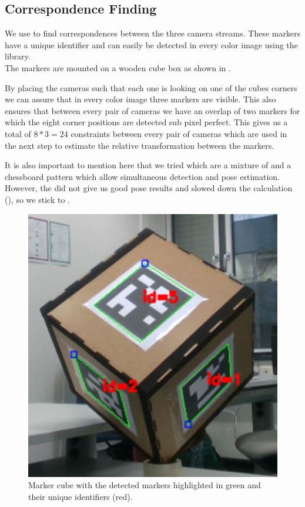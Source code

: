 \documentclass[10pt,twocolumn,letterpaper]{article}
\begin{document}
\subsection{Correspondence Finding}
We use \aruco{} to find correspondences between the three camera streams. These markers have a unique identifier and can easily be detected in every color image using the \opencv{} library.\\
The markers are mounted on a wooden cube box as shown in .

By placing the cameras such that each one is looking on one of the cubes corners we can assure that in every color image three markers are visible. This also ensures that between every pair of cameras we have an overlap of two markers for which the eight corner positions are detected sub pixel perfect. This gives us a total of $8*3=24$ constraints between every pair of cameras which are used in the next step to estimate the relative transformation between the markers.

It is also important to mention here that we tried \charuco{} which are a mixture of \aruco{} and a chessboard pattern which allow simultaneous detection and pose estimation. However, the \charuco{} did not give us good pose results and slowed down the calculation (), so we stick to \aruco{}. 
%
%
\begin{figure}[t]
	\begin{center}
		\includegraphics[width=0.6\linewidth]{imgs/cube}
	\end{center}
	\caption{Marker cube with the detected markers highlighted in green and their unique identifiers (red).}
	\label{fig:cube}
\end{figure}
%
%
\end{document}
